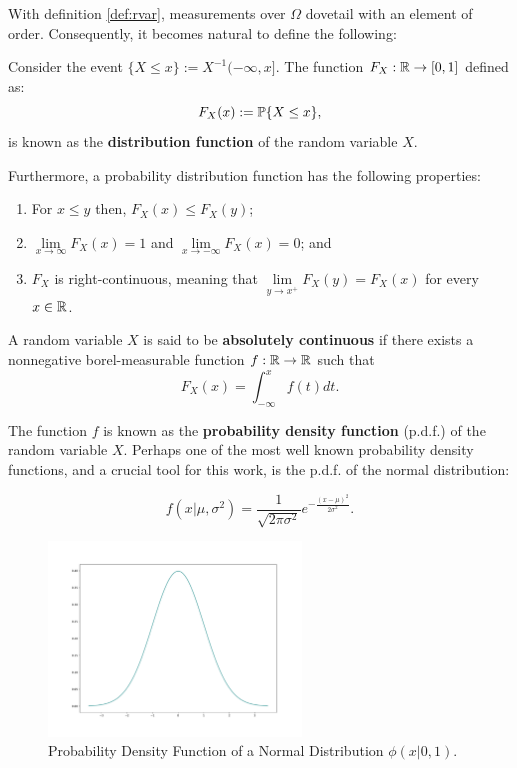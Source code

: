 \documentclass[../TGMAFFIRO.tex]{subfiles}
\begin{document}
With definition \ref{def:rvar}, measurements over $\Omega$ dovetail with an element of order. Consequently, it becomes natural to define the following:

\begin{definition}\label{dist_func}
	Consider the event $\{X \leq x\} := X^{-1}(-\infty, x]$. The function $F_X: \mathbb{R} \rightarrow [0, 1]$ defined as:
	\begin{equation}
		F_X(x) := \mathbb{P}\{X \leq x\},
	\end{equation}
	is known as the \textbf{distribution function} of the random variable $X$.
\end{definition}

Furthermore, a probability distribution function has the following properties:
\begin{enumerate}
	\item For $x \leq y$ then, $F_X(x) \leq F_X(y)$;
	\item $\lim\limits_{x\to\infty} F_X(x) = 1$ and $\lim\limits_{x\to - \infty} F_X(x) = 0$; and
	\item $F_X$ is right-continuous, meaning that $\lim\limits_{y\to x^+} F_X(y) = F_X(x)$ for every $x \in \mathbb{R}$.
\end{enumerate}

\begin{definition}
	A random variable $X$ is said to be \textbf{absolutely continuous} if there exists a nonnegative borel-measurable function $f: \mathbb{R}\rightarrow\mathbb{R}$ such that 
	\begin{equation}
		F_X(x) = \int_{-\infty}^{x} f(t) dt.
	\end{equation}
\end{definition}


The function $f$ is known as the \textbf{probability density function} (p.d.f.) of the random variable $X$. Perhaps one of the most well known probability density functions, and a crucial tool for this work, is the p.d.f. of the normal distribution:

\begin{equation}\label{eq:normal_distribution}
	f(x|\mu, \sigma^2) = \frac{1}{\sqrt{2\pi\sigma^2}}e^{-\frac{(x - \mu)^2}{2\sigma^2}}.
\end{equation}

\begin{figure}[h]
	\centering
	\includegraphics[width=0.6\textwidth]{../images/normal_distribution}
	\caption{Probability Density Function of a Normal Distribution $\phi(x|0,1)$.}
	\label{fig:normal_distribution}
\end{figure}
\end{document}
